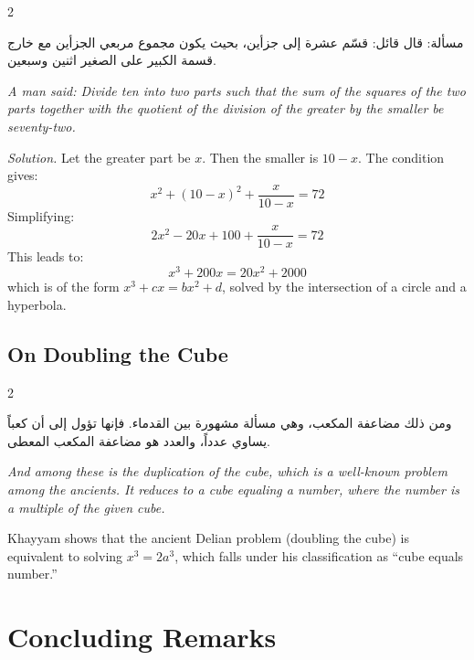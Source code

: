 \documentclass[11pt,a4paper]{book}
\begin{document}
\begin{propositionbox}
\begin{paracol}{2}

\begin{Arabic}
مسألة: قال قائل: قسّم عشرة إلى جزأين، بحيث يكون مجموع مربعي الجزأين مع خارج قسمة الكبير على الصغير اثنين وسبعين.
\end{Arabic}

\switchcolumn

\textit{A man said: Divide ten into two parts such that the sum of the squares of the two parts together with the quotient of the division of the greater by the smaller be seventy-two.}

\end{paracol}
\end{propositionbox}

\textit{Solution.} Let the greater part be $x$. Then the smaller is $10 - x$. The condition gives:
\[x^2 + (10 - x)^2 + \frac{x}{10 - x} = 72\]
Simplifying:
\[2x^2 - 20x + 100 + \frac{x}{10 - x} = 72\]
This leads to:
\[x^3 + 200x = 20x^2 + 2000\]
which is of the form $x^3 + cx = b x^2 + d$, solved by the intersection of a circle and a hyperbola.

\subsection{On Doubling the Cube}
\label{subsec:delian}

\begin{paracol}{2}

\begin{Arabic}
ومن ذلك مضاعفة المكعب، وهي مسألة مشهورة بين القدماء. فإنها تؤول إلى أن كعباً يساوي عدداً، والعدد هو مضاعفة المكعب المعطى.
\end{Arabic}

\switchcolumn

\textit{And among these is the duplication of the cube, which is a well-known problem among the ancients. It reduces to a cube equaling a number, where the number is a multiple of the given cube.}

\end{paracol}

Khayyam shows that the ancient Delian problem (doubling the cube) is equivalent to solving $x^3 = 2a^3$, which falls under his classification as ``cube equals number.''

\clearpage
\section{Concluding Remarks}
\label{sec:conclusion}
\end{document}

